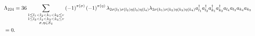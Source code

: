 \documentclass[12pt]{article}
\begin{document}
\begin{subequations}
\begin{align}
& \Lambda _{224}=36\sum_{\substack{ 1\leq l_{1}<l_{2}<k_{1}<k_{2}\leq r \\ %
1\leq l_{3}<l_{4}<k_{3}<k_{4}\leq r \\ \sigma ,\eta \in S_{4}}}\left(
-1\right) ^{\pi \left( \sigma \right) }\left( -1\right) ^{\pi \left( \eta
\right) }\lambda _{2\sigma \left( l_{1}\right) \sigma \left( l_{2}\right)
\eta \left( l_{3}\right) \eta \left( l_{4}\right) }\lambda _{2\sigma \left(
k_{1}\right) \sigma \left( k_{2}\right) \eta \left( k_{3}\right) \eta \left(
k_{4}\right) }a_{l_{1}}^{\dagger }a_{l_{2}}^{\dagger }a_{k_{1}}^{\dagger
}a_{k_{2}}^{\dagger }a_{l_{4}}a_{l_{3}}a_{k_{4}}a_{k_{3}}  \notag \\
& =0.
\end{align}
\end{subequations}
\end{document}
